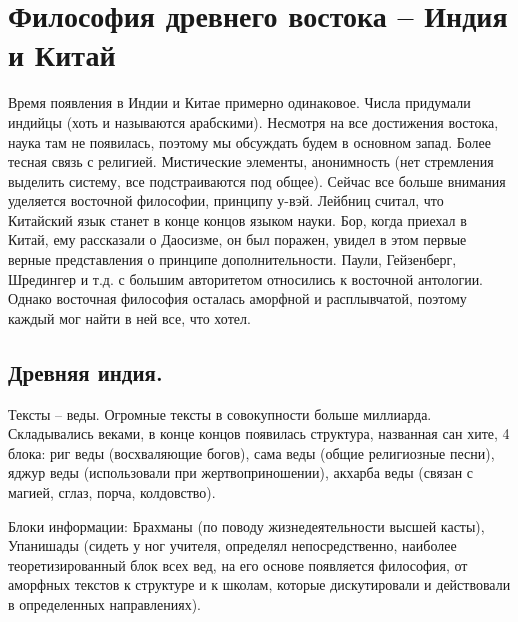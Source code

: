 \documentclass[a4paper, 12pt]{article}
\begin{document}
\clearpage

\section{Философия древнего востока -- Индия и Китай}

Время появления в Индии и Китае примерно одинаковое. Числа придумали индийцы (хоть и называются арабскими). Несмотря на все достижения востока, наука там не появилась, поэтому мы обсуждать будем в основном запад. Более тесная связь с религией. Мистические элементы, анонимность (нет стремления выделить систему, все подстраиваются под общее). Сейчас все больше внимания уделяется восточной философии, принципу у-вэй. Лейбниц считал, что Китайский язык станет в конце концов языком науки. Бор, когда приехал в Китай, ему рассказали о Даосизме, он был поражен, увидел в этом первые верные представления о принципе дополнительности. Паули, Гейзенберг, Шредингер и т.д. с большим авторитетом относились к восточной антологии. Однако восточная философия осталась аморфной и расплывчатой, поэтому каждый мог найти в ней все, что хотел. 

\subsection{Древняя индия.} Тексты -- веды. Огромные тексты в совокупности больше миллиарда. Складывались веками, в конце концов появилась структура, названная сан хите, 4 блока: риг веды (восхваляющие богов), сама веды (общие религиозные песни), яджур веды (использовали при жертвоприношении), акхарба веды (связан с магией, сглаз, порча, колдовство). 

Блоки информации: Брахманы (по поводу жизнедеятельности высшей касты), Упанишады (сидеть у ног учителя, определял непосредственно, наиболее теоретизированный блок всех вед, на его основе появляется философия, от аморфных текстов к структуре и к школам, которые дискутировали и действовали в определенных направлениях).
\end{document}
